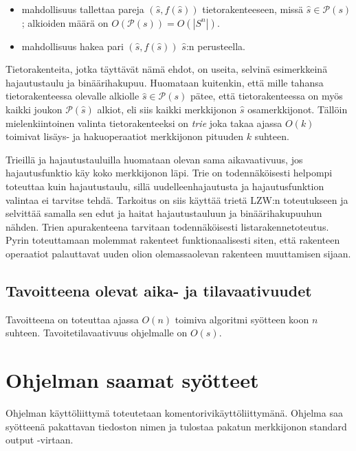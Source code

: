 \documentclass{article}
\begin{document}
\begin{itemize}
  \item mahdollisuus tallettaa pareja $(\hat{s}, f(\hat{s}))$ tietorakenteeseen, missä $\hat{s} \in \mathcal{P}(s)$; alkioiden määrä on $O(\mathcal{P}(s)) = O(|S^n|)$.
  \item mahdollisuus hakea pari $(\hat{s}, f(\hat{s}))$ $\hat{s}$:n perusteella.
\end{itemize}

Tietorakenteita, jotka täyttävät nämä ehdot, on useita, selvinä esimerkkeinä hajautustaulu ja binäärihakupuu. Huomataan kuitenkin, että mille tahansa tietorakenteessa olevalle alkiolle $\hat{s} \in \mathcal{P}(s)$ pätee, että tietorakenteessa on myös kaikki joukon $\mathcal{P}(\hat{s})$ alkiot, eli siis kaikki merkkijonon $\hat{s}$ osamerkkijonot. Tällöin mielenkiintoinen valinta tietorakenteeksi on \textit{trie}  joka takaa ajassa $O(k)$ toimivat lisäys- ja hakuoperaatiot merkkijonon pituuden $k$ suhteen. \cite{Knuth1}\cite{Navarro1}

Trieillä ja hajautustauluilla huomataan olevan sama aikavaativuus, jos hajautusfunktio käy koko merkkijonon läpi. Trie on todennäköisesti helpompi toteuttaa kuin hajautustaulu, sillä uudelleenhajautusta ja hajautusfunktion valintaa ei tarvitse tehdä. Tarkoitus on siis käyttää trietä LZW:n toteutukseen ja selvittää samalla sen edut ja haitat hajautustauluun ja binäärihakupuuhun nähden. Trien apurakenteena tarvitaan todennäköisesti listarakennetoteutus. Pyrin toteuttamaan molemmat rakenteet funktionaalisesti siten, että rakenteen operaatiot palauttavat uuden olion olemassaolevan rakenteen muuttamisen sijaan.

\subsection{Tavoitteena olevat aika- ja tilavaativuudet}

Tavoitteena on toteuttaa ajassa $O(n)$ toimiva algoritmi syötteen koon $n$ suhteen. \cite{Navarro1} Tavoitetilavaativuus ohjelmalle on $O(s)$.

\section{Ohjelman saamat syötteet}

Ohjelman käyttöliittymä toteutetaan komentorivikäyttöliittymänä. Ohjelma saa syötteenä pakattavan tiedoston nimen ja tulostaa pakatun merkkijonon standard output -virtaan.

\printbibliography
\end{document}
